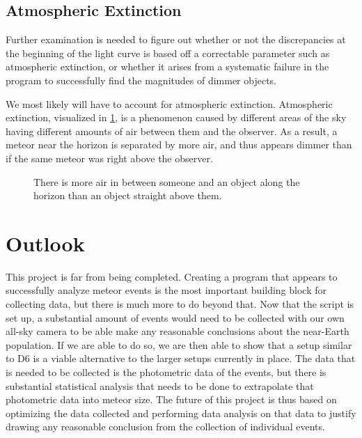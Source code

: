 \subsection{Atmospheric Extinction}
Further examination is needed to figure out whether or not the discrepancies at the beginning of the light curve is based off a correctable parameter such as atmospheric extinction, or whether it arises from a systematic failure in the program to successfully find the magnitudes of dimmer objects.

We most likely will have to account for atmospheric extinction. Atmospheric extinction, visualized in \ref{fig:extinction}, is a phenomenon caused by different areas of the sky having different amounts of air between them and the observer. As a result, a meteor near the horizon is separated by more air, and thus appears dimmer than if the same meteor was right above the observer. 
\begin{figure}[ht!]
	\centering
	\caption{There is more air in between someone and an object along the horizon than an object straight above them.}
	\label{fig:extinction}
\end{figure}


\section{Outlook}
This project is far from being completed. Creating a program that appears to successfully analyze meteor events is the most important building block for collecting data, but there is much more to do beyond that. Now that the script is set up, a substantial amount of events would need to be collected with our own all-sky camera to be able make any reasonable conclusions about the near-Earth population. If we are able to do so, we are then able to show that a setup similar to D6 is a viable alternative to the larger setups currently in place.  The data that is needed to be collected is the photometric data of the events, but there is substantial statistical analysis that needs to be done to extrapolate that photometric data into meteor size. The future of this project is thus based on optimizing the data collected and performing data analysis on that data to justify drawing any reasonable conclusion from the collection of individual events.
